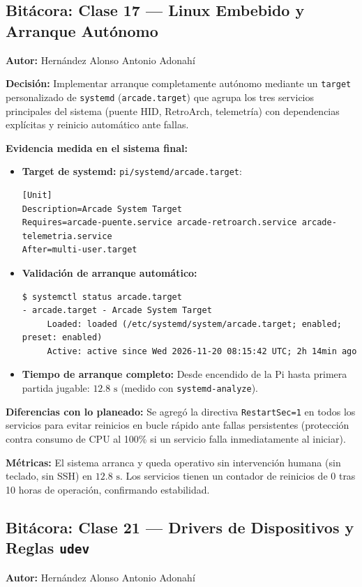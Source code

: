 \subsection{Bitácora: Clase 17 — Linux Embebido y Arranque Autónomo}
\textbf{Autor:} Hernández Alonso Antonio Adonahí

\textbf{Decisión:} Implementar arranque completamente autónomo mediante un \texttt{target} personalizado de \texttt{systemd} (\texttt{arcade.target}) que agrupa los tres servicios principales del sistema (puente HID, RetroArch, telemetría) con dependencias explícitas y reinicio automático ante fallas.

\textbf{Evidencia medida en el sistema final:}
\begin{itemize}
	\item \textbf{Target de systemd:} \texttt{pi/systemd/arcade.target}:
	\begin{lstlisting}
[Unit]
Description=Arcade System Target
Requires=arcade-puente.service arcade-retroarch.service arcade-telemetria.service
After=multi-user.target
	\end{lstlisting}
	\item \textbf{Validación de arranque automático:}
	\begin{lstlisting}
$ systemctl status arcade.target
- arcade.target - Arcade System Target
     Loaded: loaded (/etc/systemd/system/arcade.target; enabled; preset: enabled)
     Active: active since Wed 2026-11-20 08:15:42 UTC; 2h 14min ago
	\end{lstlisting}
	\item \textbf{Tiempo de arranque completo:} Desde encendido de la Pi hasta primera partida jugable: $12.8\text{ s}$ (medido con \texttt{systemd-analyze}).
\end{itemize}

\textbf{Diferencias con lo planeado:} Se agregó la directiva \texttt{RestartSec=1} en todos los servicios para evitar reinicios en bucle rápido ante fallas persistentes (protección contra consumo de CPU al 100\% si un servicio falla inmediatamente al iniciar).

\textbf{Métricas:} El sistema arranca y queda operativo sin intervención humana (sin teclado, sin SSH) en $12.8\text{ s}$. Los servicios tienen un contador de reinicios de 0 tras 10 horas de operación, confirmando estabilidad.

\subsection{Bitácora: Clase 21 — Drivers de Dispositivos y Reglas \texttt{udev}}
\textbf{Autor:} Hernández Alonso Antonio Adonahí


